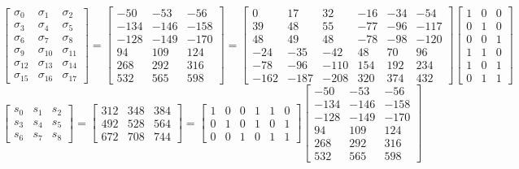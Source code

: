 \documentclass{article}%
\begin{document}
\[%
\left[\begin{matrix}\sigma_{0} & \sigma_{1} & \sigma_{2}\\\sigma_{3} & \sigma_{4} & \sigma_{5}\\\sigma_{6} & \sigma_{7} & \sigma_{8}\\\sigma_{9} & \sigma_{10} & \sigma_{11}\\\sigma_{12} & \sigma_{13} & \sigma_{14}\\\sigma_{15} & \sigma_{16} & \sigma_{17}\end{matrix}\right] = \left[\begin{matrix}-50 & -53 & -56\\-134 & -146 & -158\\-128 & -149 & -170\\94 & 109 & 124\\268 & 292 & 316\\532 & 565 & 598\end{matrix}\right] = \left[\begin{matrix}0 & 17 & 32 & -16 & -34 & -54\\39 & 48 & 55 & -77 & -96 & -117\\48 & 49 & 48 & -78 & -98 & -120\\-24 & -35 & -42 & 48 & 70 & 96\\-78 & -96 & -110 & 154 & 192 & 234\\-162 & -187 & -208 & 320 & 374 & 432\end{matrix}\right] \left[\begin{matrix}1 & 0 & 0\\0 & 1 & 0\\0 & 0 & 1\\1 & 1 & 0\\1 & 0 & 1\\0 & 1 & 1\end{matrix}\right]%
\]%
\[%
\left[\begin{matrix}s_{0} & s_{1} & s_{2}\\s_{3} & s_{4} & s_{5}\\s_{6} & s_{7} & s_{8}\end{matrix}\right] = \left[\begin{matrix}312 & 348 & 384\\492 & 528 & 564\\672 & 708 & 744\end{matrix}\right] = \left[\begin{matrix}1 & 0 & 0 & 1 & 1 & 0\\0 & 1 & 0 & 1 & 0 & 1\\0 & 0 & 1 & 0 & 1 & 1\end{matrix}\right] \left[\begin{matrix}-50 & -53 & -56\\-134 & -146 & -158\\-128 & -149 & -170\\94 & 109 & 124\\268 & 292 & 316\\532 & 565 & 598\end{matrix}\right]%
\]%
\end{document}
